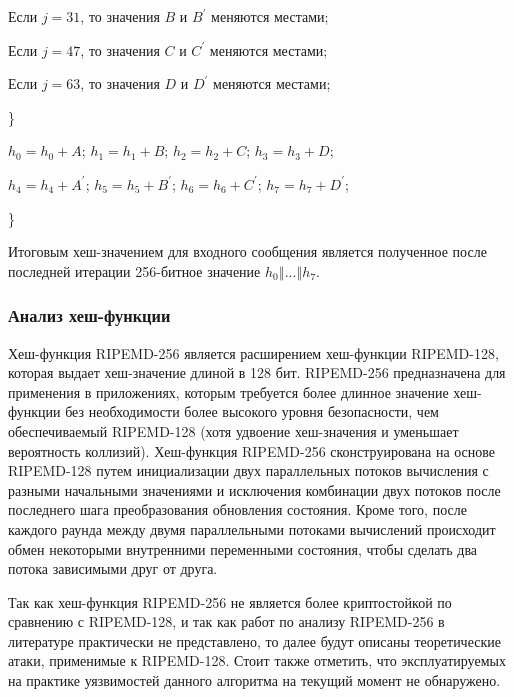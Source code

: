 \documentclass{./civarticle}
\begin{document}
    \hspace{1cm} Если $j = 31$, то значения $B$ и $B^{'}$ меняются местами;

    \hspace{1cm} Если $j = 47$, то значения $C$ и $C^{'}$ меняются местами;

    \hspace{1cm} Если $j = 63$, то значения $D$ и $D^{'}$ меняются местами;

    \hspace{0.5cm} \}

    \hspace{0.5cm} $h_0 = h_0 + A$; $h_1 = h_1 + B$; $h_2 = h_2 + C$; $h_3 = h_3 + D$;

    \hspace{0.5cm} $h_4 = h_4 + A^{'}$; $h_5 = h_5 + B^{'}$; $h_6 = h_6 + C^{'}$; $h_7 = h_7 + D^{'}$; 
    
\}

Итоговым хеш-значением для входного сообщения является полученное после последней итерации 256-битное значение $h_0 \mathbin\Vert ... \mathbin\Vert h_7$.

\subsubsection{Анализ хеш-функции}

Хеш-функция RIPEMD-256 является расширением хеш-функции RIPEMD-128, которая выдает хеш-значение длиной в 128 бит. RIPEMD-256 предназначена для применения в приложениях, которым требуется более длинное значение хеш-функции без необходимости более высокого уровня безопасности, чем обеспечиваемый RIPEMD-128 (хотя удвоение хеш-значения и уменьшает вероятность коллизий). Хеш-функция RIPEMD-256 сконструирована на основе RIPEMD-128 путем инициализации двух параллельных потоков вычисления с разными начальными значениями и исключения комбинации двух потоков после последнего шага преобразования обновления состояния. Кроме того, после каждого раунда между двумя параллельными потоками вычислений происходит обмен некоторыми внутренними переменными состояния, чтобы сделать два потока зависимыми друг от друга.

Так как хеш-функция RIPEMD-256 не является более криптостойкой по сравнению с RIPEMD-128, и так как работ по анализу RIPEMD-256 в литературе практически не представлено, то далее будут описаны теоретические атаки, применимые к RIPEMD-128. Стоит также отметить, что эксплуатируемых на практике уязвимостей данного алгоритма на текущий момент не обнаружено.
\end{document}

